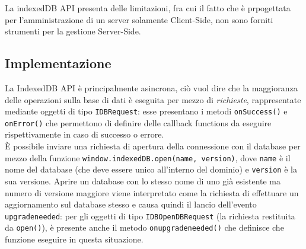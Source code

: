 \documentclass[a4paper, 12pt, twoside, openright]{book}
\begin{document}
La indexedDB API presenta delle limitazioni, fra cui il fatto che è prpogettata per l'amministrazione di un server solamente Client-Side, non sono forniti strumenti per la gestione Server-Side.\\
\subsection{Implementazione}
La IndexedDB API è principalmente asincrona, ciò vuol dire che la maggioranza delle operazioni sulla base di dati è eseguita per mezzo di \textit{richieste}, rappresentate mediante oggetti di tipo \texttt{IDBRequest}: esse presentano i metodi \texttt{onSuccess()} e \texttt{onError()} che permettono di definire delle callback functions da eseguire rispettivamente in caso di successo o errore.\\
È possibile inviare una richiesta di apertura della connessione con il database per mezzo della funzione \texttt{window.indexedDB.open(name, version)}, dove \texttt{name} è il nome del database (che deve essere unico all'interno del dominio) e \texttt{version} è la sua versione. Aprire un database con lo stesso nome di uno già esistente ma numero di versione maggiore viene interpretato come la richiesta di effettuare un aggiornamento sul database stesso e causa quindi il lancio dell'evento \texttt{upgradeneeded}: per gli oggetti di tipo \texttt{IDBOpenDBRequest} (la richiesta restituita da \texttt{open()}), è presente anche il metodo \texttt{onupgradeneeded()} che definisce che funzione eseguire in questa situazione.\\
\backmatter

\begingroup %
  \makeatletter
  \let\ps@plain\ps@empty
  \makeatother
  
\endgroup
\end{document}
